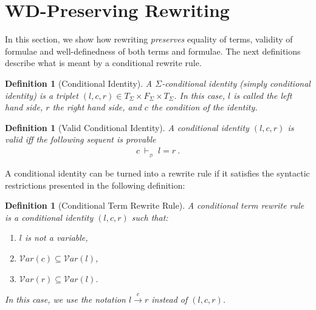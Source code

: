 \documentclass[copyright]{eptcs}
\newtheorem{definition}[theorem]{Definition}
\begin{document}
\section{WD-Preserving Rewriting}\label{wdpres}
In this section, we show how rewriting \textit{preserves} equality of terms, validity of formulae and well-definedness of both terms and formulae. The next definitions describe what is meant by a conditional rewrite rule.

\begin{definition}[Conditional Identity]
A $\Sigma$-conditional identity (simply conditional identity) is a triplet $(l, c, r)\in T_{\Sigma}\times F_{\Sigma}\times T_{\Sigma}$. In this case, $l$ is called the left hand side, $r$ the right hand side, and $c$ the condition of the identity.
\end{definition}

\begin{definition}[Valid Conditional Identity]\label{validCI}
A conditional identity $(l, c, r)$ is valid iff the following sequent is provable
\begin{eqnarray*}
c~\vdash_{_\mathcal{D}}~l=r~.
\end{eqnarray*}
\end{definition}

A conditional identity can be turned into a rewrite rule if it satisfies the syntactic restrictions presented in the following definition:

\begin{definition}[Conditional Term Rewrite Rule]
A conditional term rewrite rule is a conditional identity $(l, c, r)$ such that:
\begin{enumerate}
\item $l$ is not a variable,
\item $\mathcal{V}ar(c) \subseteq \mathcal{V}ar(l)$,
\item $\mathcal{V}ar(r) \subseteq \mathcal{V}ar(l)$.
\end{enumerate}
In this case, we use the notation $l \xrightarrow{c} r$ instead of $(l, c, r)$.
\end{definition}
\end{document}
